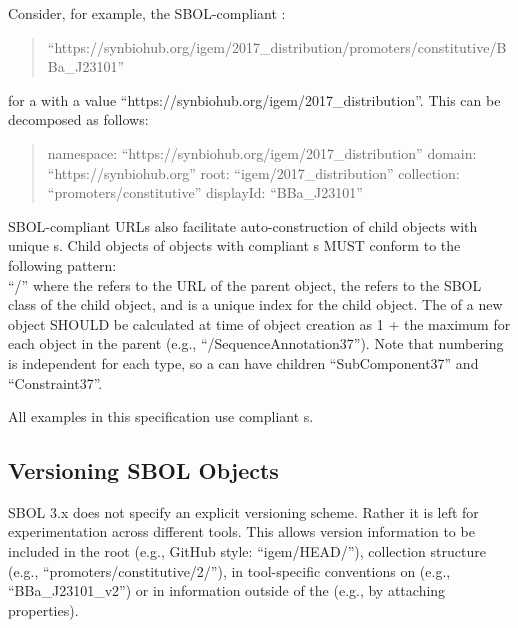 Consider, for example, the SBOL-compliant :
\begin{quote}``https://synbiohub.org/igem/2017\_distribution/promoters/constitutive/BBa\_J23101''\end{quote} 
for a  with a  value ``https://synbiohub.org/igem/2017\_distribution''.
This  can be decomposed as follows:
\begin{quote} 
namespace: ``https://synbiohub.org/igem/2017\_distribution'' \linebreak
domain: ``https://synbiohub.org'' \linebreak
root: ``igem/2017\_distribution'' \linebreak
collection: ``promoters/constitutive'' \linebreak
displayId: ``BBa\_J23101'' \linebreak
\end{quote}

SBOL-compliant URLs also facilitate auto-construction of child objects with unique s. 
Child objects of  objects with compliant s MUST conform to the following pattern:\\ ``/'' where the  refers to the URL of the parent object, the  refers to the SBOL class of the child object, and  is a unique index for the child object. 
The  of a new object SHOULD be calculated at time of object creation as 1 + the maximum  for each  object in the parent (e.g., ``/SequenceAnnotation37''). 
Note that numbering is independent for each type, so a  can have children ``SubComponent37'' and ``Constraint37''.

All examples in this specification use compliant s.

\subsection{Versioning SBOL Objects}

SBOL 3.x does not specify an explicit versioning scheme. Rather it is left for experimentation across different tools. This allows version information to be included in the root (e.g., GitHub style: ``igem/HEAD/''), collection structure (e.g., ``promoters/constitutive/2/''), in tool-specific conventions on  (e.g., ``BBa\_J23101\_v2'') or in information outside of the  (e.g., by attaching  properties).

